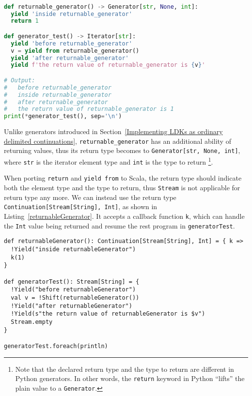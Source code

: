 \begin{lstlisting}[language=Python,style=Python3,caption={Use \lstinline{yield from} and \lstinline{return} in Python generators},label={returnable_generator}]

def returnable_generator() -> Generator[str, None, int]:
  yield 'inside returnable_generator'
  return 1

def generator_test() -> Iterator[str]:
  yield 'before returnable_generator'
  v = yield from returnable_generator()
  yield 'after returnable_generator'
  yield f'the return value of returnable_generator is {v}'

# Output:
#   before returnable_generator
#   inside returnable_generator
#   after returnable_generator
#   the return value of returnable_generator is 1
print(*generator_test(), sep='\n')
\end{lstlisting}

Unlike generators introduced in Section~\ref{Implementing LDKs as ordinary delimited continuations}, \lstinline{returnable_generator} has an additional ability of returning values, thus its return type becomes to \lstinline{Generator[str, None, int]}, where \lstinline{str} is the iterator element type and \lstinline{int} is the type to return \footnote{Note that the declared return type and the type to return are different in Python generators. In other words, the \lstinline{return} keyword in Python ``lifts'' the plain value to a \lstinline{Generator}.}.

When porting \lstinline{return} and \lstinline{yield from} to Scala, the return type should indicate both the element type and the type to return, thus \lstinline{Stream} is not applicable for return type any more. We can instead use the return type \lstinline{Continuation[Stream[String], Int]}, as shown in Listing~\ref{returnableGenerator}. It accepts a callback function \lstinline{k}, which can handle the \lstinline{Int} value being returned and resume the rest program in \lstinline{generatorTest}.

\begin{lstlisting}[caption={Returning an additional value in LDK-based generators},label={returnableGenerator}]
def returnableGenerator(): Continuation[Stream[String], Int] = { k =>
  !Yield("inside returnableGenerator")
  k(1)
}

def generatorTest(): Stream[String] = {
  !Yield("before returnableGenerator")
  val v = !Shift(returnableGenerator())
  !Yield("after returnableGenerator")
  !Yield(s"the return value of returnableGenerator is $v")
  Stream.empty
}

generatorTest.foreach(println)
\end{lstlisting}

